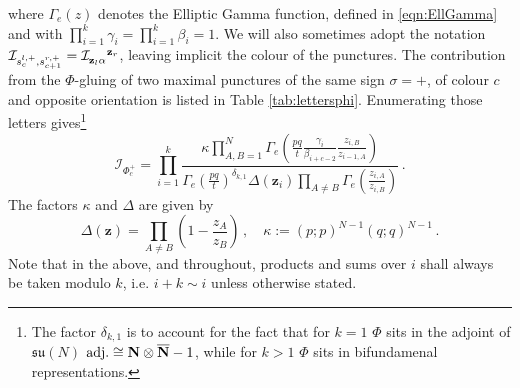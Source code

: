 \documentclass[main.tex]{subfiles}
\begin{document}
where $\Gamma_e(z)$ denotes the Elliptic Gamma function, defined in \eqref{eqn:EllGamma} and with \newline$\prod_{i=1}^k\gamma_i=\prod_{i=1}^k\beta_i=1$. We will also sometimes adopt the notation $\mathcal{I}_{s_{c}^{l,+},s_{c+1}^{r,+}}=\mathcal{I}\indices{_{\mathbf{z}_l\alpha}^{\mathbf{z}_r}}$, leaving implicit the colour of the punctures. The contribution from the $\Phi$-gluing of two maximal punctures of the same sign $\sigma=+$, of colour $c$ and opposite orientation is listed in Table \ref{tab:lettersphi}. Enumerating those letters gives\footnote{The factor $\delta_{k,1}$ is to account for the fact that for $k=1$ $\Phi$ sits in the adjoint of $\mathfrak{su}(N)$ $\text{adj.}\cong \mathbf{N}\otimes\overline{\mathbf{N}}-1$, while for $k>1$ $\Phi$ sits in bifundamenal representations.}
\begin{equation}\label{eqn:tubeindex}
\mathcal{I}_{\Phi^+_c}=\prod_{i=1}^k\frac{\kappa\prod_{A,B=1}^N\Gamma_e\left(\frac{pq}{t}\frac{\gamma_i}{\beta_{i+c-2}}\frac{z_{i,B}}{z_{i-1,A}}\right)}{\Gamma_e\left(\frac{pq}{t}\right)^{\delta_{k,1}}\Delta(\mathbf{z}_{i})\prod_{A\neq B}\Gamma_e\left(\frac{z_{i,A}}{z_{i,B}}\right)}\,.
\end{equation}
The factors $\kappa$ and $\Delta$ are given by
\begin{equation}
\Delta(\mathbf{z})=\prod_{A\neq B}\left(1-\frac{z_A}{z_B}\right)\,,\quad \kappa:=(p;p)^{N-1}(q;q)^{N-1}\,.
\end{equation}
Note that in the above, and throughout, products and sums over $i$ shall always be taken modulo $k$, i.e. $i+k\sim i$ unless otherwise stated.
\end{document}
